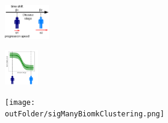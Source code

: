 \documentclass[8pt,xcolor=table]{beamer}
\begin{document}
\begin{frame}
\begin{columns}[T]
\begin{column}{.3\textwidth}
    \vspace{-2em}
    
    \begin{figure}
    \centering
    \includegraphics[height=1.5cm]{disease_axis.png}
    \end{figure}
    
    \begin{figure}
    \centering
    \includegraphics[height=1.5cm, trim=120 0 120 0]{Disease_progression_one_sigmoid_confidence.png}
    \end{figure}
    
    \begin{figure}
    \centering
    \texttt{[image: \\outFolder/sigManyBiomkClustering.png]}
    \end{figure}

    \end{column}
  \end{columns}
  
% 
%   


\end{frame}
\end{document}
